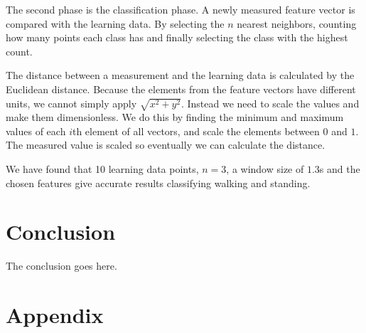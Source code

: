 \documentclass[journal]{IEEEtran}
\begin{document}
The second phase is the classification phase. A newly measured feature vector
is compared with the learning data. By selecting the $n$ nearest neighbors,
counting how many points each class has and finally selecting the class with
the highest count.

The distance between a measurement and the learning data is calculated by the
Euclidean distance. Because the elements from the feature vectors have
different units, we cannot simply apply $\sqrt{ x^2+y^2 }$. Instead we need to
scale the values and make them dimensionless. We do this by finding the minimum
and maximum values of each $i$th element of all vectors, and scale the elements
between $0$ and $1$. The measured value is scaled so eventually we can
calculate the distance.

We have found that 10 learning data points, $n=3$, a window size of $1.3$s
and the chosen features give accurate results classifying walking and standing.

\section{Conclusion}
The conclusion goes here.

\appendices
\section{Appendix}

\ifCLASSOPTIONcaptionsoff
  \newpage
\fi



\end{document}
